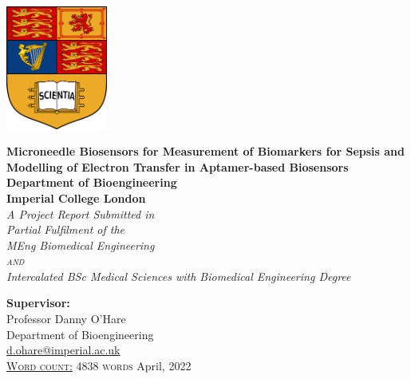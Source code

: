 \begin{titlepage}

\begin{center}

\includegraphics[width=0.25\textwidth]{img/collegecrest.png}\\
\vspace{3em}

\huge\textbf{Microneedle Biosensors for Measurement of Biomarkers for Sepsis and Modelling of Electron Transfer in Aptamer-based Biosensors}\\
\vspace{1em}
{\Large{\textbf{Department of Bioengineering \\ Imperial College London}}}\\[0.5in]

{\large\emph{A Project Report Submitted in \\Partial Fulfilment of the \\ \vspace{.4cm}
MEng Biomedical Engineering \\ \textsc{and}\\\vspace{-.32cm} Intercalated BSc Medical Sciences with Biomedical Engineering Degree}}
\vspace{1in}

      
\normalsize {\textbf{Supervisor:}} \\
Professor Danny O'Hare\\
\vspace{1em}
Department of Bioengineering\\
\url{d.ohare@imperial.ac.uk}\\
\vspace{1.5cm}
\textsc{\underline{Word count:} 4838 words}
\vfill
April, 2022
\end{center}
\clearpage

\end{titlepage}

